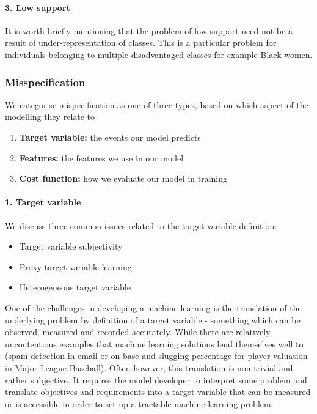 \paragraph*{3. Low support}

It is worth briefly mentioning that the problem of low-support need not be a result of under-representation of classes. This is a particular problem for individuals belonging to multiple disadvantaged classes for example Black women.

\subsubsection*{Misspecification}

We categorise mispecification as one of three types, based on which aspect of the modelling they relate to
\begin{enumerate}
\item \textbf{Target variable:} the events our model predicts
\item \textbf{Features:} the features we use in our model
\item \textbf{Cost function:} how we evaluate our model in training
\end{enumerate}

\paragraph*{1. Target variable}

We discuss three common issues related to the target variable definition:
%
\begin{itemize}
\item Target variable subjectivity
\item Proxy target variable learning
\item Heterogeneous target variable
\end{itemize}

One of the challenges in developing a machine learning is the translation of the underlying problem by definition of a target variable - something which can be observed, measured and recorded accurately. While there are relatively uncontentious examples that machine learning solutions lend themselves well to (spam detection in email or on-base and slugging percentage for player valuation in Major League Baseball). Often however, this translation is non-trivial and rather subjective. It requires the model developer to interpret some problem and translate objectives and requirements into a target variable that can be measured or is accessible in order to set up a tractable machine learning problem.

